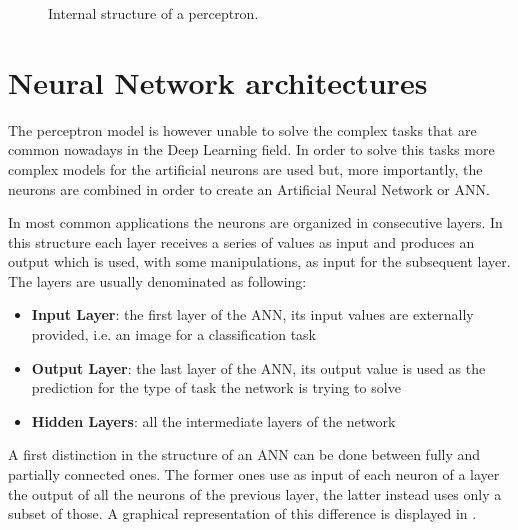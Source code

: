 \begin{figure}[h]
    \centering

\caption{Internal structure of a perceptron.}
    \label{fig:perceptron}
\end{figure}

\section{Neural Network architectures}

The perceptron model is however unable to solve the complex tasks that are common nowadays in the Deep Learning field. In order to solve this tasks more complex models for the artificial neurons are used but, more importantly, the neurons are combined in order to create an Artificial Neural Network or ANN.

In most common applications the neurons are organized in consecutive layers.
In this structure each layer receives a series of values as input and produces an output which is used, with some manipulations, as input for the subsequent layer. The layers are usually denominated as following:
\begin{itemize}
    \item \textbf{Input Layer}: the first layer of the ANN, its input values are externally provided, i.e. an image for a classification task
    \item \textbf{Output Layer}: the last layer of the ANN, its output value is used as the prediction for the type of task the network is trying to solve
    \item \textbf{Hidden Layers}: all the intermediate layers of the network  
\end{itemize}

A first distinction in the structure of an ANN can be done between fully and partially connected ones. The former ones use as input of each neuron of a layer the output of all the neurons of the previous layer, the latter instead uses only a subset of those. A graphical representation of this difference is displayed in .

